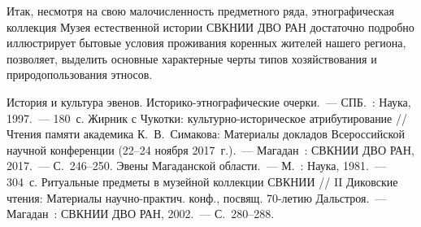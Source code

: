 Итак, несмотря на свою малочисленность предметного ряда, этнографическая коллекция Музея естественной истории СВКНИИ ДВО РАН достаточно подробно иллюстрирует бытовые условия проживания коренных жителей нашего региона, позволяет, выделить основные характерные черты типов хозяйствования и природопользования этносов.

\begin{thebibliography}{99}
\bibitem{}История и культура эвенов. Историко-этнографические очерки.~--- СПБ.~: Наука, 1997.~--- 180~с.
\bibitem{} Жирник с Чукотки: культурно-историческое атрибутирование // Чтения памяти академика К.~В.~Симакова: Материалы докладов Всероссийской научной конференции (22--24 ноября 2017~г.).~--- Магадан~: СВКНИИ ДВО РАН, 2017.~--- С.~246--250.
\bibitem{} Эвены Магаданской области.~--- М.~: Наука, 1981.~--- 304~с.
\bibitem{} Ритуальные предметы в музейной коллекции СВКНИИ // II Диковские чтения: Материалы научно-практич. конф., посвящ. 70-летию Дальстроя.~--- Магадан~: СВКНИИ ДВО РАН, 2002.~--- С.~280--288.

\end{thebibliography}
